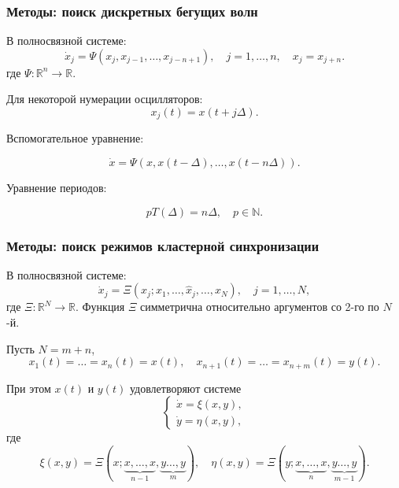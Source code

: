 \begin{frame}
	\frametitle{Методы: поиск дискретных бегущих волн}
	
	В полносвязной системе:
	\begin{equation*}
		\dot{x}_j= \Psi(x_j, x_{j-1}, \ldots, x_{j-n+1}), \quad j=1, \ldots, n, \quad x_j = x_{j+n}.
	\end{equation*}
	где $\Psi:\mathbb{R}^{n}\to\mathbb{R}$.
	
	Для некоторой нумерации осцилляторов:
	\begin{equation*}
		x_j(t) = x(t + j\Delta).
	\end{equation*}
	
	Вспомогательное уравнение:
	
	\begin{equation}
		\dot{x}= \Psi(x, x(t-\Delta), \ldots, x(t-n\Delta)).
	\end{equation}
	
	Уравнение периодов:
	
	\begin{equation}
		p T(\Delta) = n\Delta, \quad p \in \mathbb{N}.
	\end{equation}
\end{frame}

\begin{frame}
	\frametitle{Методы: поиск режимов кластерной синхронизации}
	
	В полносвязной системе:
	\begin{equation*}
		\dot{x}_j = \Xi(x_j;x_1,\ldots,\hat{x}_j,\ldots,x_{N}),\quad j=1,\ldots,N,
	\end{equation*}
	где $\Xi:\mathbb{R}^{N}\to\mathbb{R}$. Функция $\Xi$ симметрична относительно аргументов со 2-го по $N$-й.
	
	\pause
	\bigskip
	
	Пусть $N = m + n$,
	\begin{equation}
		x_1(t)=\ldots=x_n(t)=x(t),\quad x_{n+1}(t)=\ldots=x_{n+m}(t)=y(t).
	\end{equation}
	
	При этом $x(t)$ и $y(t)$ удовлетворяют системе
	\[
	\begin{cases}
		\dot{x}=\xi(x,y),\\
		\dot{y}=\eta(x,y),
	\end{cases}
	\]
	где 
	\[
	\xi(x,y)=\Xi(x; \underbrace{x, \ldots, x}_{n-1},\underbrace{y \ldots, y}_{m}),\quad
	\eta(x,y)=\Xi(y; \underbrace{x, \ldots, x}_{n},\underbrace{y \ldots, y}_{m-1}).
	\]
\end{frame}

